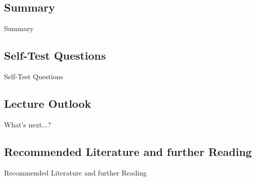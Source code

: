 \subsection{Summary}

\begin{frame}{Summary}{}

\end{frame}


\subsection{Self-Test Questions}

\begin{frame}{Self-Test Questions}{}\important

\end{frame}


\subsection{Lecture Outlook}

\begin{frame}{What's next...?}{}
\end{frame}


\subsection{Recommended Literature and further Reading}

\begin{frame}{Recommended Literature and further Reading}{}
	\footnotesize
	\begin{thebibliography}{2}

	\end{thebibliography}
\end{frame}


